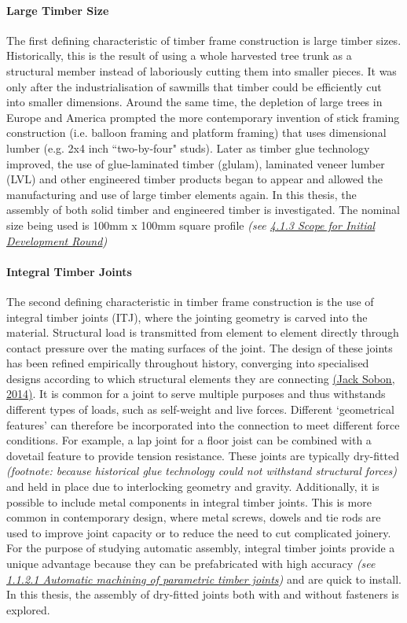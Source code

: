 \documentclass[11pt]{book}
\begin{document}
\paragraph{Large Timber Size}

The first defining characteristic of timber frame construction is large timber sizes. Historically, this is the result of using a whole harvested tree trunk as a structural member instead of laboriously cutting them into smaller pieces. It was only after the industrialisation of sawmills that timber could be efficiently cut into smaller dimensions. Around the same time, the depletion of large trees in Europe and America prompted the more contemporary invention of stick framing construction (i.e. balloon framing and platform framing) that uses dimensional lumber (e.g. 2x4 inch ``two-by-four" studs). Later as timber glue technology improved, the use of glue-laminated timber (glulam), laminated veneer lumber (LVL) and other engineered timber products began to appear and allowed the manufacturing and use of large timber elements again. In this thesis, the assembly of both solid timber and engineered timber is investigated. The nominal size being used is 100mm x 100mm square profile \textit{(see \uline{4.1.3 Scope for Initial Development Round})} 

\paragraph{Integral Timber Joints}

The second defining characteristic in timber frame construction is the use of integral timber joints (ITJ), where the jointing geometry is carved into the material.\textbf{ }Structural load is transmitted from element to element directly through contact pressure over the mating surfaces of the joint. The design of these joints has been refined empirically throughout history, converging into specialised designs according to which structural elements they are connecting \href{https://www.zotero.org/google-docs/?BttU29}{(Jack Sobon, 2014)}. It is common for a joint to serve multiple purposes and thus withstands different types of loads, such as self-weight and live forces. Different ‘geometrical features’ can therefore be incorporated into the connection to meet different force conditions. For example, a lap joint for a floor joist can be combined with a dovetail feature to provide tension resistance. These joints are typically dry-fitted \textit{(footnote: because historical glue technology could not withstand structural forces) }and held in place due to interlocking geometry and gravity. Additionally, it is possible to include metal components in integral timber joints. This is more common in contemporary design, where metal screws, dowels and tie rods are used to improve joint capacity or to reduce the need to cut complicated joinery. For the purpose of studying automatic assembly, integral timber joints provide a unique advantage because they can be prefabricated with high accuracy \textit{(see \uline{1.1.2.1 Automatic machining of parametric timber joints})} and are quick to install. In this thesis, the assembly of dry-fitted joints both with and without fasteners is explored.
\end{document}
